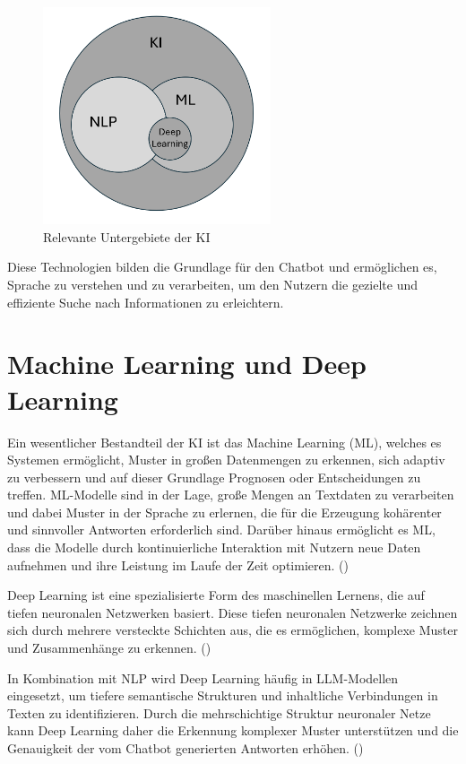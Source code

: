 \begin{figure}[H]
    \centering
    \includegraphics[width=0.6\textwidth]{img/KI_areas.png}
    \caption{Relevante Untergebiete der KI}
    \label{fig:areas_ki}
\end{figure}

Diese Technologien bilden die Grundlage für den Chatbot und ermöglichen es, Sprache zu verstehen und zu verarbeiten, um den Nutzern die gezielte und effiziente Suche nach Informationen zu erleichtern.


\section{Machine Learning und Deep Learning}

Ein wesentlicher Bestandteil der \ac{KI} ist das Machine Learning (\ac{ML}), welches es Systemen ermöglicht, Muster in großen Datenmengen zu erkennen, 
sich adaptiv zu verbessern und auf dieser Grundlage Prognosen oder Entscheidungen zu treffen. 
\ac{ML}-Modelle sind in der Lage, große Mengen an Textdaten zu verarbeiten und dabei Muster in der Sprache zu erlernen, die für die Erzeugung kohärenter und sinnvoller Antworten erforderlich sind.
Darüber hinaus ermöglicht es \ac{ML}, dass die Modelle durch kontinuierliche Interaktion mit Nutzern neue Daten aufnehmen und ihre Leistung im Laufe der Zeit optimieren. (\cite[S. 406]{Sarferaz2023})

Deep Learning ist eine spezialisierte Form des maschinellen Lernens, die auf tiefen neuronalen Netzwerken basiert. 
Diese tiefen neuronalen Netzwerke zeichnen sich durch mehrere versteckte Schichten aus, die es ermöglichen, komplexe Muster und Zusammenhänge zu erkennen. (\cite[S. 436 ff.]{LeCun2015})

In Kombination mit \ac{NLP} wird Deep Learning häufig in \ac{LLM}-Modellen eingesetzt, um tiefere semantische Strukturen und inhaltliche Verbindungen in Texten zu identifizieren. 
Durch die mehrschichtige Struktur neuronaler Netze kann Deep Learning daher die Erkennung komplexer Muster unterstützen und die Genauigkeit der vom Chatbot generierten Antworten erhöhen. (\cite[S. 605 f.]{Otter2021})


